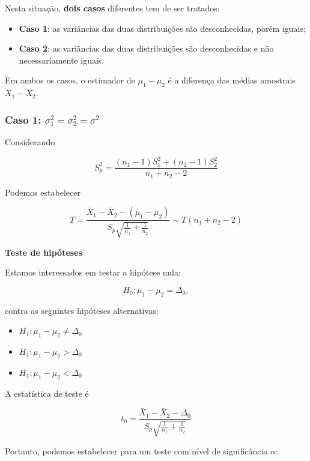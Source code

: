 \documentclass[
]{book}
\providecommand{\tightlist}{%
  \setlength{\itemsep}{0pt}\setlength{\parskip}{0pt}}
\begin{document}
Nesta situação, \textbf{dois casos} diferentes tem de ser tratados:

\begin{itemize}
\tightlist
\item
  \textbf{Caso 1}: as variâncias das duas distribuições são desconhecidas, porém iguais;
\item
  \textbf{Caso 2}: as variâncias das duas distribuições são desconhecidas e não necessariamente iguais.
\end{itemize}

Em ambos os casos, o estimador de \(\mu_1-\mu_2\) é a diferença das médias amostrais \(\bar X_1-\bar X_2\).

\hypertarget{caso-1-sigma2_1sigma2_2sigma2}{%
\subsubsection{\texorpdfstring{Caso 1: \(\sigma^2_1=\sigma^2_2=\sigma^2\)}{Caso 1: \textbackslash sigma\^{}2\_1=\textbackslash sigma\^{}2\_2=\textbackslash sigma\^{}2}}\label{caso-1-sigma2_1sigma2_2sigma2}}

Considerando

\[S^2_p=\frac{(n_1-1)S^2_1+(n_2-1)S^2_2}{n_1+n_2-2}\]

Podemos estabelecer

\[T=\frac{\bar X_1-\bar X_2-(\mu_1-\mu_2)}{S_p\sqrt{\frac{1}{n_1}+\frac{1}{n_2}}}\sim T(n_1+n_2-2)\]

\textbf{Teste de hipóteses}

Estamos interessados em testar a hipótese nula:

\[H_0: \mu_1-\mu_2=\Delta_0,\]

contra as seguintes hipóteses alternativas:

\begin{itemize}
\tightlist
\item
  \(H_1: \mu_1-\mu_2 \ne \Delta_0\)
\item
  \(H_1: \mu_1-\mu_2 > \Delta_0\)
\item
  \(H_1: \mu_1-\mu_2 < \Delta_0\)
\end{itemize}

A estatística de teste é

\[t_0=\frac{\bar X_1-\bar X_2-\Delta_0}{S_p\sqrt{\frac{1}{n_1}+\frac{1}{n_2}}}\]

Portanto, podemos estabelecer para um teste com nível de significância \(\alpha\):
\end{document}
